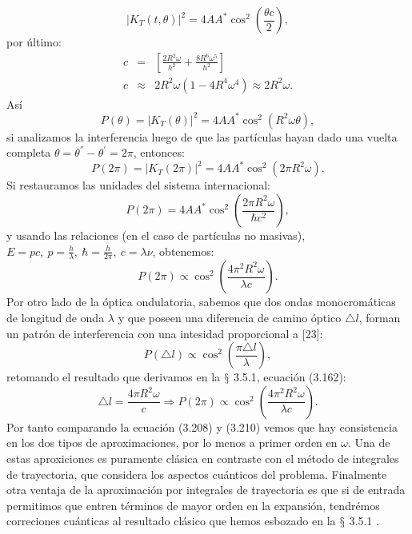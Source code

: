 \begin{equation}
|K_{T}(t,\theta)|^{2}=4AA^{*}\cos^{2}\left(\frac{\theta c}{2}\right),
\end{equation}
por último:
\begin{eqnarray}
\nonumber c&=&\left[\frac{2R^{2}\omega}{h^{2}}+\frac{8R^{6}\omega^{5}}{h^{2}}\right]\\
\nonumber c&\approx &  2R^{2}\omega(1-4R^{4}\omega^{4})\approx2R^{2}\omega .
\end{eqnarray}
Así 
\begin{equation}
P(\theta)=|K_{T}(\theta)|^{2}=4AA^{*}\cos^{2}(R^{2}\omega\theta),
\end{equation}
si analizamos la interferencia luego de que las partículas hayan dado una vuelta completa $\theta=\theta^{''}-\theta^{'}=2\pi$, entonces:
\begin{equation}
P(2\pi)=|K_{T}(2\pi)|^{2}=4AA^{*}\cos^{2}(2\pi R^{2}\omega).
\end{equation}
Si restauramos las unidades del sistema internacional:
\begin{equation}
P(2\pi)=4AA^{*}\cos^{2}\left(\frac{2\pi R^{2}\omega}{\hbar c^{2}}\right),
\end{equation}
y usando las relaciones (en el caso de partículas no masivas), $E=pc,\ p=\frac{h}{\lambda},\ \hbar=\frac{h}{2\pi},\ c=\lambda \nu$, obtenemos:
\begin{equation}
P(2\pi)\propto\cos^{2}\left(\frac{4\pi^{2}R^{2}\omega}{\lambda c}\right).
\end{equation}
Por otro lado de la óptica ondulatoria, sabemos que dos ondas monocromáticas de longitud de onda $\lambda$ 	y que poseen una diferencia de camino óptico $\triangle l$, forman un patrón de interferencia con una intesidad proporcional a [23]:
\begin{equation}
P(\triangle l)\propto\cos^{2}\left(\frac{\pi\triangle l}{\lambda}\right),
\end{equation} 
retomando el resultado que derivamos en la $\mathsection$ 3.5.1, ecuación (3.162):
\begin{equation}
\triangle l=\frac{4\pi R^{2}\omega}{c}\Rightarrow P(2\pi)\propto\cos^{2}\left(\frac{4\pi^{2}R^{2}\omega}{\lambda c}\right).
\end{equation}
Por tanto comparando la ecuación (3.208) y (3.210) vemos que hay consistencia en los dos tipos de aproximaciones, por lo menos a primer orden en $\omega$. Una de estas aproxiciones es puramente clásica en contraste con el método de integrales de trayectoria, que considera los aspectos cuánticos del problema. Finalmente otra ventaja de la aproximación por integrales de trayectoria es que si de entrada permitimos que entren términos de mayor orden en la expansión, tendrémos correciones cuánticas al resultado clásico que hemos esbozado en la $\mathsection$ 3.5.1 . 
 




